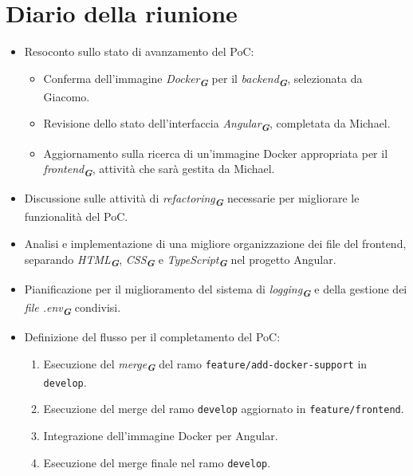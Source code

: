 
\section{Diario della riunione}

\begin{itemize}
    \item Resoconto sullo stato di avanzamento del PoC:
    \begin{itemize}
        \item Conferma dell'immagine \emph{Docker}\textsubscript{\textit{\textbf{G}}} per il \emph{backend}\textsubscript{\textit{\textbf{G}}}, selezionata da Giacomo.
        \item Revisione dello stato dell'interfaccia \emph{Angular}\textsubscript{\textit{\textbf{G}}}, completata da Michael.
        \item Aggiornamento sulla ricerca di un'immagine Docker appropriata per il \emph{frontend}\textsubscript{\textit{\textbf{G}}}, attività che sarà gestita da Michael.
    \end{itemize}
    \item Discussione sulle attività di \emph{refactoring}\textsubscript{\textit{\textbf{G}}} necessarie per migliorare le funzionalità del PoC.
    \item Analisi e implementazione di una migliore organizzazione dei file del frontend, separando \emph{HTML}\textsubscript{\textit{\textbf{G}}}, \emph{CSS}\textsubscript{\textit{\textbf{G}}} e \emph{TypeScript}\textsubscript{\textit{\textbf{G}}} nel progetto Angular.
    \item Pianificazione per il miglioramento del sistema di \emph{logging}\textsubscript{\textit{\textbf{G}}} e della gestione dei \emph{file .env}\textsubscript{\textit{\textbf{G}}} condivisi.
    \item Definizione del flusso per il completamento del PoC:
    \begin{enumerate}
        \item Esecuzione del \emph{merge}\textsubscript{\textit{\textbf{G}}} del ramo \texttt{feature/add-docker-support} in \texttt{develop}.
        \item Esecuzione del merge del ramo \texttt{develop} aggiornato in \texttt{feature/frontend}.
        \item Integrazione dell'immagine Docker per Angular.
        \item Esecuzione del merge finale nel ramo \texttt{develop}.

\end{enumerate}
\end{itemize}
